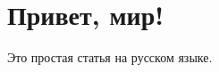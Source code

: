 \documentclass[a4paper,12pt]{article}
\begin{document}
\section*{Привет, мир!}

Это простая статья на русском языке.
\end{document}
